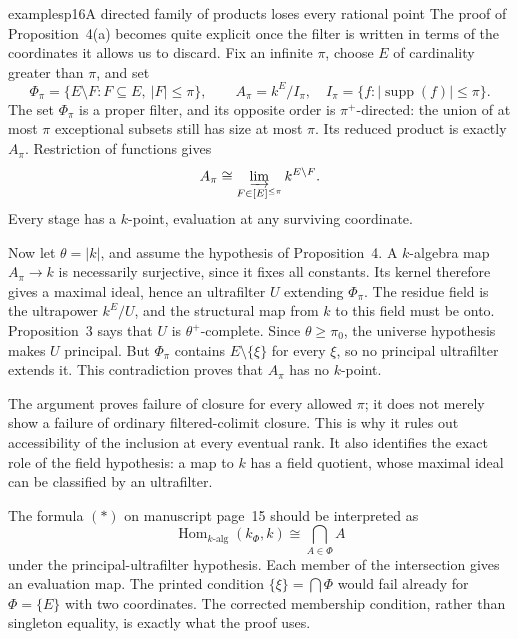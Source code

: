 \begin{dcomment}{examples}{p16}{A directed family of products loses every rational point}
The proof of Proposition~4(a) becomes quite explicit once the filter is written in terms of the coordinates it allows us to discard. Fix an infinite $\pi$, choose $E$ of cardinality greater than $\pi$, and set
\[
 \Phi_\pi=\{E\setminus F:F\subseteq E,\ |F|\le\pi\},
 \qquad
 A_\pi=k^E/I_\pi,
 \quad
 I_\pi=\{f:|\operatorname{supp}(f)|\le\pi\}.
\]
The set $\Phi_\pi$ is a proper filter, and its opposite order is $\pi^+$-directed: the union of at most $\pi$ exceptional subsets still has size at most $\pi$. Its reduced product is exactly $A_\pi$. Restriction of functions gives
\[
 A_\pi\cong
 \varinjlim_{F\in[E]^{\le\pi}} k^{E\setminus F}.
\]
Every stage has a $k$-point, evaluation at any surviving coordinate.

Now let $\theta=|k|$, and assume the hypothesis of Proposition~4. A $k$-algebra map $A_\pi\to k$ is necessarily surjective, since it fixes all constants. Its kernel therefore gives a maximal ideal, hence an ultrafilter $U$ extending $\Phi_\pi$. The residue field is the ultrapower $k^E/U$, and the structural map from $k$ to this field must be onto. Proposition~3 says that $U$ is $\theta^+$-complete. Since $\theta\ge\pi_0$, the universe hypothesis makes $U$ principal. But $\Phi_\pi$ contains $E\setminus\{\xi\}$ for every $\xi$, so no principal ultrafilter extends it. This contradiction proves that $A_\pi$ has no $k$-point.

The argument proves failure of closure for every allowed $\pi$; it does not merely show a failure of ordinary filtered-colimit closure. This is why it rules out accessibility of the inclusion at every eventual rank. It also identifies the exact role of the field hypothesis: a map to $k$ has a field quotient, whose maximal ideal can be classified by an ultrafilter.

The formula $(*)$ on manuscript page~15 should be interpreted as
\[
 \operatorname{Hom}_{k\text{-}\mathrm{alg}}(k_\Phi,k)
       \cong\bigcap_{A\in\Phi}A
\]
under the principal-ultrafilter hypothesis. Each member of the intersection gives an evaluation map. The printed condition $\{\xi\}=\bigcap\Phi$ would fail already for $\Phi=\{E\}$ with two coordinates. The corrected membership condition, rather than singleton equality, is exactly what the proof uses.
\end{dcomment}

